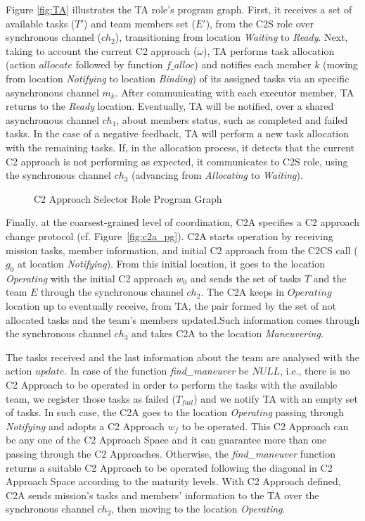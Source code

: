 Figure \ref{fig:TA} illustrates the TA role's program graph. First, it receives a set of available tasks ($T'$) and team members set ($E'$), from the C2S role over synchronous channel ($ch_2$), transitioning from location \textit{Waiting} to \textit{Ready}. Next, taking to account the current C2 approach ($\omega$), TA performs task allocation (action $allocate$ followed by function $f\_alloc$) and notifies each member $k$ (moving from location \textit{Notifying} to location \textit{Binding}) of its assigned tasks via an specific asynchronous channel $m_k$. After communicating with each executor member, TA returns to the \textit{Ready} location. Eventually, TA will be notified, over a shared asynchronous channel $ch_1$, about members status, such as completed and failed tasks. In the case of a negative feedback, TA will perform a new task allocation with the remaining tasks. If, in the allocation process, it detects that the current C2 approach is not performing as expected, it communicates to C2S role, using the synchronous channel $ch_3$ (advancing from \textit{Allocating} to \textit{Waiting}).

\begin{figure}[!ht]
    \centering
    \scalebox{.65}{}
    \caption{C2 Approach Selector Role Program Graph}
    \label{fig:C2S}
\end{figure}

Finally, at the coarsest-grained level of coordination, C2A specifies a C2 approach change protocol (cf. Figure~\ref{fig:c2a_pg}). C2A starts operation by receiving mission tasks, member information, and initial C2 approach from the C2CS call ($g_0$ at location \textit{Notifying}). From this initial location, it goes to the location \textit{Operating} with the initial C2 approach $w_0$ and sends the set of tasks $T$ and the team $E$ through the synchronous channel $ch_2$. The C2A keeps in $Operating$ location up to eventually receive, from TA, the pair formed by the set of not allocated tasks and the team's members updated.Such information comes through the synchronous channel $ch_3$ and takes C2A to the location \textit{Maneuvering}.

The tasks received and the last information about the team are analysed with the action $update$. In case of the function \emph{find\_maneuver} be $NULL$, i.e., there is no C2 Approach to be operated in order to perform the tasks with the available team, we register those tasks as failed ($T_{fail}$) and we notify TA with an empty set of tasks. In such case, the C2A goes to the location \emph{Operating} passing through \emph{Notifying} and adopts a C2 Approach $w_f$ to be operated. This C2 Approach can be any one of the C2 Approach Space and it can guarantee more than one passing through the C2 Approaches. Otherwise, the  \emph{find\_maneuver} function returns a suitable C2 Approach to be operated following the diagonal in C2 Approach Space according to the maturity levels.
With C2 Approach defined, C2A sends mission's tasks and members' information to the TA over the synchronous channel $ch_2$, then moving to the location \emph{Operating}.


